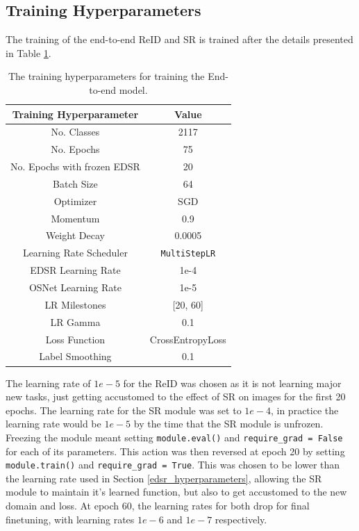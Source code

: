\subsection{Training Hyperparameters}
The training of the end-to-end \acs{ReID} and \acs{SR} is trained after the details presented in Table \ref{tab:endtoendtrainingparameters}.
\begin{table}[H]
    \centering
    \begin{tabular}{|c|c|}\hline
         \cellcolor[HTML]{D8E9F7} \textbf{Training Hyperparameter}&  \cellcolor[HTML]{D8E9F7} \textbf{Value}\\\hline
        No. Classes & 2117\\\hline
        No. Epochs & 75\\\hline
        No. Epochs with frozen EDSR & 20\\\hline
        Batch Size & 64 \\\hline
        Optimizer & \acs{SGD} \\\hline
        Momentum &0.9 \\\hline
        Weight Decay & 0.0005\\\hline
        Learning Rate Scheduler & \texttt{MultiStepLR}\\\hline
        EDSR Learning Rate & 1e-4\\\hline
        OSNet Learning Rate & 1e-5\\\hline
        LR Milestones &  [20, 60]\\\hline
        LR Gamma &  0.1\\\hline
        Loss Function & CrossEntropyLoss\\\hline 
        Label Smoothing & 0.1\\ \hline
    \end{tabular}
    \caption{The training hyperparameters for training the End-to-end model.}
\label{tab:endtoendtrainingparameters}
\end{table}

\noindent The learning rate of \(1e-5\) for the \acs{ReID} was chosen as it is not learning major new tasks, just getting accustomed to the effect of \acs{SR} on images for the first 20 epochs. The learning rate for the \acs{SR} module was set to \(1e-4\), in practice the learning rate would be \(1e-5\) by the time that the \acs{SR} module is unfrozen. Freezing the module meant setting \texttt{module.eval()} and \texttt{require\_grad = False} for each of its parameters. This action was then reversed at epoch 20 by setting \texttt{module.train()} and \texttt{require\_grad = True}. This was chosen to be lower than the learning rate used in Section \ref{edsr_hyperparameters}, allowing the \acs{SR} module to maintain it's learned function, but also to get accustomed to the new domain and loss. At epoch 60, the learning rates for both drop for final finetuning, with learning rates \(1e-6\) and \(1e-7\) respectively. 

